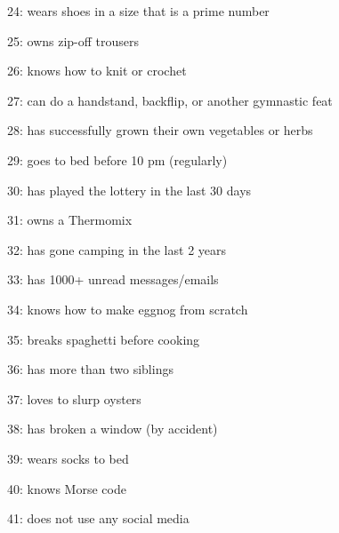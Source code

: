 \item 24: wears shoes in a size that is a prime number\\
\item 25: owns zip-off trousers\\
\item 26: knows how to knit or crochet\\
\item 27: can do a handstand, backflip, or another gymnastic feat\\
\item 28: has successfully grown their own vegetables or herbs\\
\item 29: goes to bed before 10 pm (regularly)\\
\item 30: has played the lottery in the last 30 days\\
\item 31: owns a Thermomix\\
\item 32: has gone camping in the last 2 years\\
\item 33: has 1000+ unread messages/emails\\
\item 34: knows how to make eggnog from scratch\\
\item 35: breaks spaghetti before cooking\\
\item 36: has more than two siblings\\
\item 37: loves to slurp oysters\\
\item 38: has broken a window (by accident)\\
\item 39: wears socks to bed\\
\item 40: knows Morse code\\
\item 41: does not use any social media\\
